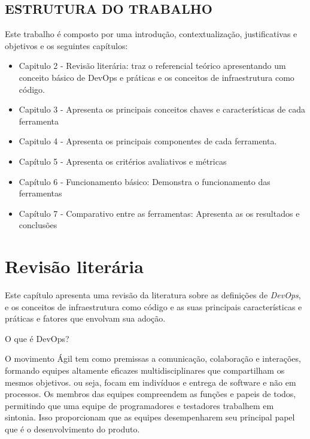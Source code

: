 \section{\esp ESTRUTURA DO TRABALHO}
Este trabalho é composto por uma introdução, contextualização, justificativas e objetivos e os seguintes capítulos:
\begin{itemize}
\item Capitulo 2 - Revisão literária: traz  o referencial teórico apresentando um conceito básico de DevOps e práticas e os conceitos de infraestrutura como código.  
\item Capitulo 3 - Apresenta os principais conceitos chaves e características de cada ferramenta
\item Capitulo 4 - Apresenta os principais componentes de cada ferramenta.
\item Capítulo 5 - Apresenta os critérios avaliativos e  métricas
\item Capítulo 6 - Funcionamento básico: Demonstra o funcionamento das ferramentas 
\item Capítulo 7 - Comparativo entre as ferramentas: Apresenta as os resultados e conclusões
\end{itemize}

\chapter{ Revisão literária}

Este capítulo apresenta uma revisão da literatura sobre as definições de \textit{DevOps}, e os conceitos de infraestrutura como código e as suas principais características e práticas e fatores que envolvam sua adoção. 


O que é DevOps?

        O movimento Ágil tem como premissas a comunicação, colaboração e interações, 
formando equipes altamente eficazes multidisciplinares que compartilham os mesmos objetivos. ou seja, focam em indivíduos e entrega de software e não em processos. 
Os membros das equipes compreendem as funções e papeis de todos, permitindo que 
uma equipe de programadores e testadores trabalhem em sintonia. Isso proporcionam 
que as equipes desempenharem seu principal papel que é o desenvolvimento do produto.   \cite{sbbrocco}

